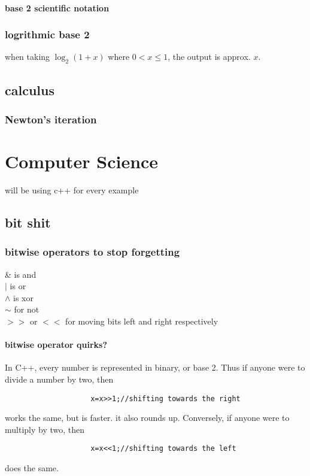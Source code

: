 \documentclass{article} %
\begin{document}
            \paragraph{ base 2 scientific notation }
        \subsubsection{logrithmic base 2}
        when taking $\log_2(1+x)$ where $0<x \leq1$, the output is approx. $x$.\\
    \subsection{calculus}
        \subsubsection{Newton's iteration}
\section{Computer Science}\label{Computer Science}
will be using c++ for every example
    \subsection{bit shit}
        \subsubsection{bitwise operators to stop forgetting}
            \begin{center}
                \& is and\\$|$ is or\\$\wedge$ is xor\\$\sim$ for not\\$>>$ or $<<$ for moving bits left and right respectively
            \end{center}
            \paragraph{bitwise operator quirks?}
                In C++, every number is represented in binary, or base 2. Thus if anyone were to divide a number by two, then
                \begin{verbatim}
                    x=x>>1;//shifting towards the right
                \end{verbatim}
                works the same, but is faster. it also rounds up. Conversely, if anyone were to multiply by two, then 
                \begin{verbatim}
                    x=x<<1;//shifting towards the left
                \end{verbatim}
                does the same.
\end{document}
